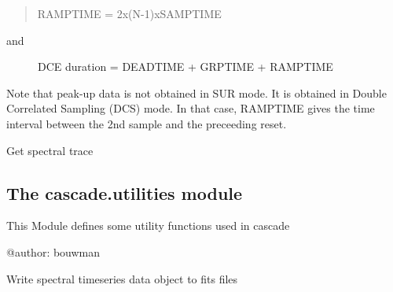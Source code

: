 \documentclass[a4paper,11pt,english]{sphinxmanual}
\begin{document}
\begin{fulllineitems}
\begin{fulllineitems}
\begin{quote}
RAMPTIME = 2x(N-1)xSAMPTIME
\end{quote}
\begin{description}
\item[{and}] \leavevmode
DCE duration = DEADTIME + GRPTIME + RAMPTIME

\end{description}

Note that peak-up data is not obtained in SUR mode. It is obtained in
Double Correlated Sampling (DCS) mode. In that case, RAMPTIME gives the
time interval between the 2nd sample and the preceeding reset.

\end{fulllineitems}


\begin{fulllineitems}
\label{\detokenize{cascade.instruments:cascade.instruments.instruments.SpitzerIRS.get_spectral_trace}}
Get spectral trace

\end{fulllineitems}


\end{fulllineitems}



\subsection{The cascade.utilities module}
\label{\detokenize{cascade.utilities:module-cascade.utilities.utilities}}\label{\detokenize{cascade.utilities:the-cascade-utilities-module}}\label{\detokenize{cascade.utilities::doc}}
This Module defines some utility functions used in cascade

@author: bouwman

\begin{fulllineitems}
\label{\detokenize{cascade.utilities:cascade.utilities.utilities.write_timeseries_to_fits}}
Write spectral timeseries data object to fits files

\end{fulllineitems}
\end{document}
